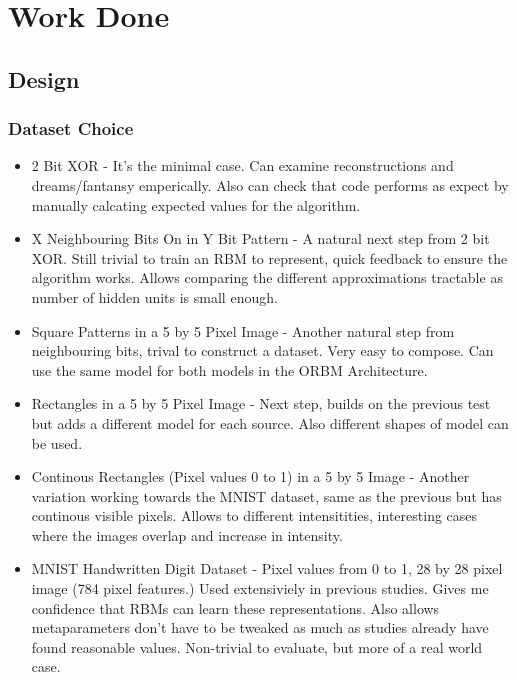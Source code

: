 \chapter{Work Done}\label{C:work}



\section{Design}\label{S:design}

\subsection{Dataset Choice}

\begin{itemize}
  \item 2 Bit XOR - It's the minimal case. Can examine reconstructions and dreams/fantansy emperically. Also can check that code performs as expect by manually calcating expected values for the algorithm.
  \item X Neighbouring Bits On in Y Bit Pattern - A natural next step from 2 bit XOR. Still trivial to train an RBM to represent, quick feedback to ensure the algorithm works. Allows comparing the different approximations tractable as number of hidden units is small enough.
  \item Square Patterns in a 5 by 5 Pixel Image - Another natural step from neighbouring bits, trival to construct a dataset. Very easy to compose. Can use the same model for both models in the ORBM Architecture.
  \item Rectangles in a 5 by 5 Pixel Image - Next step, builds on the previous test but adds a different model for each source. Also different shapes of model can be used.
  \item Continous Rectangles (Pixel values 0 to 1) in a 5 by 5 Image - Another variation working towards the MNIST dataset, same as the previous but has continous visible pixels. Allows to different intensitities, interesting cases where the images overlap and increase in intensity.
  \item MNIST Handwritten Digit Dataset - Pixel values from 0 to 1, 28 by 28 pixel image (784 pixel features.) Used extensiviely in previous studies. Gives me confidence that RBMs can learn these representations. Also allows metaparameters don't have to be tweaked as much as studies already have found reasonable values. Non-trivial to evaluate, but more of a real world case.
\end{itemize}

